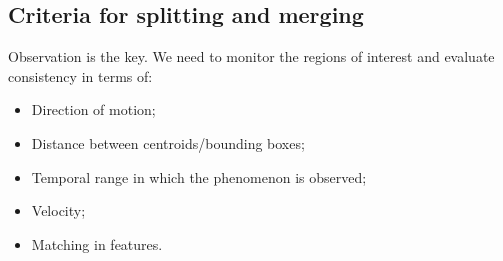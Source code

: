 \subsection{Criteria for splitting and merging}
Observation is the key. We need to monitor the regions of interest and evaluate consistency in terms of:
\begin{itemize}
    \item Direction of motion;
    \item Distance between centroids/bounding boxes;
    \item Temporal range in which the phenomenon is observed;
    \item Velocity;
    \item Matching in features.
\end{itemize}